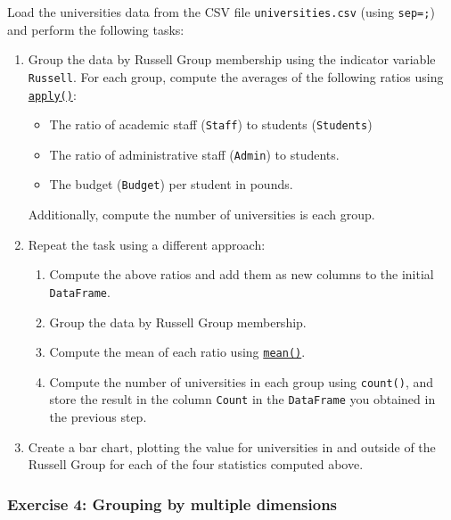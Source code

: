 \documentclass[10pt]{scrartcl}
\providecommand{\tightlist}{%
      \setlength{\itemsep}{0pt}\setlength{\parskip}{0pt}}
\begin{document}
Load the universities data from the CSV file \texttt{universities.csv}
(using \texttt{sep=\textquotesingle{};\textquotesingle{}}) and perform
the following tasks:

\begin{enumerate}
\def\labelenumi{\arabic{enumi}.}
\item
  Group the data by Russell Group membership using the indicator
  variable \texttt{Russell}. For each group, compute the averages of the
  following ratios using
  \href{https://pandas.pydata.org/pandas-docs/stable/reference/api/pandas.core.groupby.GroupBy.apply.html}{\texttt{apply()}}:

  \begin{itemize}
  \tightlist
  \item
    The ratio of academic staff (\texttt{Staff}) to students
    (\texttt{Students})
  \item
    The ratio of administrative staff (\texttt{Admin}) to students.
  \item
    The budget (\texttt{Budget}) per student in pounds.
  \end{itemize}

  Additionally, compute the number of universities is each group.
\item
  Repeat the task using a different approach:

  \begin{enumerate}
  \def\labelenumii{\arabic{enumii}.}
  \tightlist
  \item
    Compute the above ratios and add them as new columns to the initial
    \texttt{DataFrame}.
  \item
    Group the data by Russell Group membership.
  \item
    Compute the mean of each ratio using
    \href{https://pandas.pydata.org/pandas-docs/stable/reference/api/pandas.core.groupby.GroupBy.mean.html}{\texttt{mean()}}.
  \item
    Compute the number of universities in each group using
    \texttt{count()}, and store the result in the column \texttt{Count}
    in the \texttt{DataFrame} you obtained in the previous step.
  \end{enumerate}
\item
  Create a bar chart, plotting the value for universities in and outside
  of the Russell Group for each of the four statistics computed above.
\end{enumerate}

    \hypertarget{exercise-4-grouping-by-multiple-dimensions}{%
\subsubsection{Exercise 4: Grouping by multiple
dimensions}\label{exercise-4-grouping-by-multiple-dimensions}}
\end{document}
